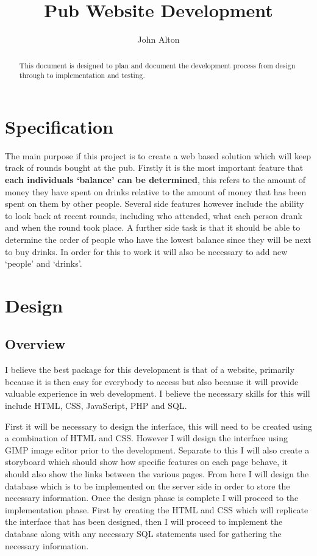 \documentclass[]{article}
\title{Pub Website Development}
\author{John Alton}
\begin{document}
\maketitle

\begin{abstract}
	This document is designed to plan and document the development process from design through to implementation and testing.
\end{abstract}

\section{Specification}
The main purpose if this project is to create a web based solution which will keep track of rounds bought at the pub. Firstly it is the most important feature that \textbf{each individuals `balance' can be determined}, this refers to the amount of money they have spent on drinks relative to the amount of money that has been spent on them by other people. Several side features however include the ability to look back at recent rounds, including who attended, what each person drank and when the round took place. A further side task is that it should be able to determine the order of people who have the lowest balance since they will be next to buy drinks. In order for this to work it will also be necessary to add new `people' and `drinks'.

\section{Design}
\subsection{Overview}
I believe the best package for this development is that of a website, primarily because it is then easy for everybody to access but also because it will provide valuable experience in web development. I believe the necessary skills for this will include HTML, CSS, JavaScript, PHP and SQL. 

First it will be necessary to design the interface, this will need to be created using a combination of HTML and CSS. However I will design the interface using GIMP image editor prior to the development. Separate to this I will also create a storyboard which should show how specific features on each page behave, it should also show the links between the various pages. From here I will design the database which is to be implemented on the server side in order to store the necessary information. Once the design phase is complete I will proceed to the implementation phase. First by creating the HTML and CSS which will replicate the interface that has been designed, then I will proceed to implement the database along with any necessary SQL statements used for gathering the necessary information.  
\end{document}
